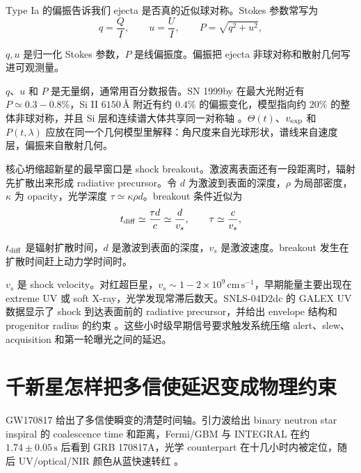 Type Ia 的偏振告诉我们 ejecta 是否真的近似球对称。Stokes 参数常写为
\begin{equation}
  q=\frac{Q}{I},\qquad
  u=\frac{U}{I},\qquad
  P=\sqrt{q^2+u^2},
  \label{eq:ch13-stokes-polarization}
\end{equation}
\begin{formulaexplain}
\(q,u\) 是归一化 Stokes 参数，\(P\) 是线偏振度。偏振把 ejecta 非球对称和散射几何写进可观测量。
\end{formulaexplain}
\(q\)、\(u\) 和 \(P\) 是无量纲，通常用百分数报告。SN 1999by 在最大光附近有 \(P\simeq0.3-0.8\%\)，Si II \(6150\,\text{\AA}\) 附近有约 \(0.4\%\) 的偏振变化，模型指向约 \(20\%\) 的整体非球对称，并且 Si 层和连续谱大体共享同一对称轴 \citep{2001ApJ...556..302H}。\(\Theta(t)\)、\(v_{\rm exp}\) 和 \(P(t,\lambda)\) 应放在同一个几何模型里解释：角尺度来自光球形状，谱线来自速度层，偏振来自散射几何。

核心坍缩超新星的最早窗口是 shock breakout。激波离表面还有一段距离时，辐射先扩散出来形成 radiative precursor。令 \(d\) 为激波到表面的深度，\(\rho\) 为局部密度，\(\kappa\) 为 opacity，光学深度 \(\tau\simeq\kappa\rho d\)。breakout 条件近似为
\begin{equation}
  t_{\rm diff}\simeq \frac{\tau d}{c}\simeq \frac{d}{v_s},
  \qquad
  \tau\simeq \frac{c}{v_s},
  \label{eq:ch13-shock-breakout-condition}
\end{equation}
\begin{formulaexplain}
\(t_{\rm diff}\) 是辐射扩散时间，\(d\) 是激波到表面的深度，\(v_s\) 是激波速度。breakout 发生在扩散时间赶上动力学时间时。
\end{formulaexplain}
\(v_s\) 是 shock velocity。对红超巨星，\(v_s\sim1-2\times10^9\,\mathrm{cm\,s^{-1}}\)，早期能量主要出现在 extreme UV 或 soft X-ray，光学发现常滞后数天。SNLS-04D2dc 的 GALEX UV 数据显示了 shock 到达表面前的 radiative precursor，并给出 envelope 结构和 progenitor radius 的约束 \citep{2008Sci...321..223S,2011ApJ...727..104C}。这些小时级早期信号要求触发系统压缩 alert、slew、acquisition 和第一轮曝光之间的延迟。

\section{千新星怎样把多信使延迟变成物理约束}

GW170817 给出了多信使瞬变的清楚时间轴。引力波给出 binary neutron star inspiral 的 coalescence time 和距离，Fermi/GBM 与 INTEGRAL 在约 \(1.74\pm0.05\,\mathrm{s}\) 后看到 GRB 170817A，光学 counterpart 在十几小时内被定位，随后 UV/optical/NIR 颜色从蓝快速转红 \citep{2017PhRvL.119p1101A,2017ApJ...848L..13A,2017ApJ...848L..12A,2017ApJ...848L..17C,2017Natur.551...75S,2017ApJ...848L..27T,2017ApJ...848L..24V,2017ApJ...848L..18N,2017Sci...358.1565E,2017ApJ...851L..21V}。

